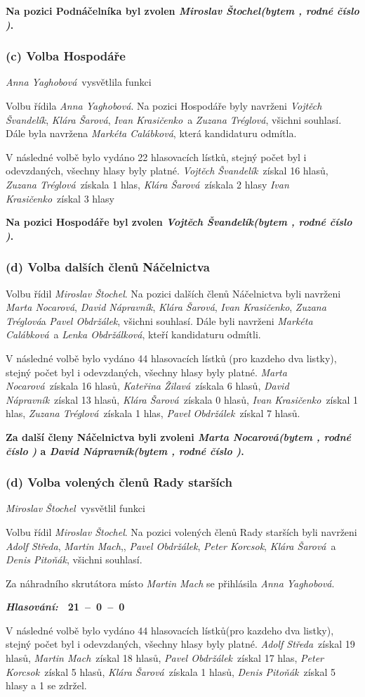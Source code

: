 \documentclass[10pt,a4paper]{report}
\newcommand{\hlas}[3]{
  \begin{flushright}
  {\it\bfseries Hlasování:\/}\ \ {\bfseries #1\ --\ #2\ --\ #3}
  \end{flushright}
}
\newcommand{\pauza}{\vskip 5mm\relax}
\newcommand{\usn}[1]{
  \vskip 5mm\relax
  \noindent{\it\bfseries Usnesení:\/}\nopagebreak
  {\bf #1}
}
\newcommand{\AS}{{\it Adolf Středa\/}}
\newcommand{\AY}{{\it Anna Yaghobová\/}}
\newcommand{\DN}{{\it David Nápravník\/}}
\newcommand{\DP}{{\it Denis Pitoňák\/}}
\newcommand{\IK}{{\it Ivan Krasičenko\/}}
\newcommand{\KZ}{{\it Kateřina Žilavá\/}}
\newcommand{\KS}{{\it Klára Šarová\/}}
\newcommand{\LO}{{\it Lenka Obdržálková\/}}
\newcommand{\MC}{{\it Markéta Calábková\/}}
\newcommand{\MM}{{\it Martin Mach\/}}
\newcommand{\MN}{{\it Marta Nocarová\/}}
\newcommand{\MS}{{\it Miroslav Štochel\/}}
\newcommand{\PO}{{\it Pavel Obdržálek\/}}
\newcommand{\PK}{{\it Peter Korcsok\/}}
\newcommand{\VS}{{\it Vojtěch Švandelík\/}}
\newcommand{\ZT}{{\it Zuzana Tréglová\/}}
\begin{document}
\usn{Na pozici Podnáčelníka byl zvolen
  \MS {\it (bytem \censor{}, rodné číslo \censor{})\/}.}

\subsubsection{(c) Volba Hospodáře}
\AY\ vysvětlila funkci
\pauza

Volbu řídila \AY.
Na pozici Hospodáře byly navrženi \VS, \KS, \IK\ a \ZT, všichni souhlasí.
Dále byla navržena \MC, která kandidaturu odmítla.

V následné volbě bylo vydáno 22 hlasovacích lístků,
stejný počet byl i odevzdaných, všechny hlasy byly platné.
  \VS\ získal 16 hlasů,
  \ZT\ získala 1 hlas,
  \KS\ získala 2 hlasy
  \IK\ získal 3 hlasy
\pauza

\usn{Na pozici Hospodáře byl zvolen
  \VS {\it (bytem \censor{}, rodné číslo \censor{})\/}.}

\subsubsection{(d) Volba dalších členů Náčelnictva}
Volbu řídil \MS.
Na pozici dalších členů Náčelnictva byli navrženi \MN, \DN, \KS, \IK, \ZT a \PO, všichni souhlasí.
Dále byli navrženi \MC\ a \LO, kteří kandidaturu odmítli.
\pauza

V následné volbě bylo vydáno 44 hlasovacích lístků (pro kazdeho dva listky),
stejný počet byl i odevzdaných, všechny hlasy byly platné.
  \MN\ získala 16 hlasů,
  \KZ\ získala 6 hlasů,
  \DN\ získal 13 hlasů,
  \KS\ získala 0 hlasů,
  \IK\ získal 1 hlas,
  \ZT\ získala 1 hlas,
  \PO\ získal 7 hlasů.
\pauza

\usn{Za další členy Náčelnictva byli zvoleni
  \MN {\it (bytem \censor{}, rodné číslo \censor{})\/} a
  \DN {\it (bytem \censor{}, rodné číslo \censor{})\/}.
}

\subsubsection{(d) Volba volených členů Rady starších}
\MS\ vysvětlil funkci
\pauza

Volbu řídil \MS.
Na pozici volených členů Rady starších byli navrženi \AS, \MM,, \PO, \PK, \KS\ a \DP, všichni souhlasí.
\pauza

Za náhradního skrutátora místo {\it \MM} se přihlásila \AY.
\hlas{21}{0}{0}
\pauza

V následné volbě bylo vydáno 44 hlasovacích lístků(pro kazdeho dva listky),
stejný počet byl i odevzdaných, všechny hlasy byly platné.
  \AS\ získal 19 hlasů,
  \MM\ získal 18 hlasů,
  \PO\ získal 17 hlas,
  \PK\ získal 5 hlasů,
  \KS\ získala 1 hlasů,
  \DP\ získal 5 hlasy a
  1 se zdržel.
  
\end{document}
